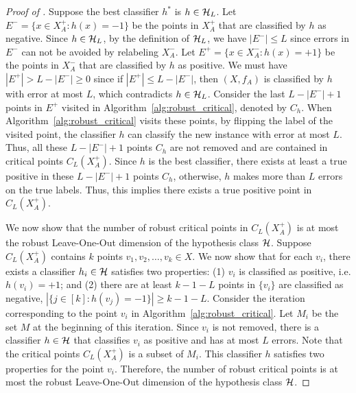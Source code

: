 \begin{proof}[Proof of ]
    Suppose the best classifier $h^*$ is $h \in \mathcal{H}_L$. Let $E^- = \{x \in X_A^+: h(x) = -1 \}$ be the points in $X_A^+$ that are classified by $h$ as negative. Since $h \in \mathcal{H}_L$, by the definition of $\mathcal{H}_L$, we have $|E^-| \leq L$ since errors in $E^-$ can not be avoided by relabeling $X_A^-$.
    Let $E^+ = \{x \in X_A^-: h(x) = +1\}$ be the points in $X_A^-$ that are classified by $h$ as positive. We must have $|E^+| > L-|E^-| \geq 0$ since if $|E^+| \leq L-|E^-|$, then $(X,f_A)$ is classified by $h$ with error at most $L$, which contradicts $h \in \mathcal{H}_L$. 
    Consider the last $L-|E^-|+1$ points in $E^+$ visited in Algorithm~\ref{alg:robust_critical}, denoted by $C_h$.
    When Algorithm~\ref{alg:robust_critical} visits these points, by flipping the label of the visited point, the classifier $h$ can classify the new instance with error at most $L$. Thus, all these $L-|E^-|+1$ points $C_h$ are not removed and are contained in critical points $C_{L}(X_A^+)$. 
    Since $h$ is the best classifier, there exists at least a true positive in these $L-|E^-|+1$ points $C_h$, otherwise, $h$ makes more than $L$ errors on the true labels. Thus, this implies there exists a true positive point in $C_{L}(X_A^+)$.

    We now show that the number of robust critical points in $C_{L}(X_A^+)$ is at most the robust Leave-One-Out dimension of the hypothesis class $\mathcal{H}$. 
    Suppose $C_{L}(X_A^+)$ contains $k$ points $v_1,v_2, \dots, v_k \in X$. 
    We now show that for each $v_i$, there exists a classifier $h_i \in \mathcal{H}$ satisfies two properties: (1) $v_i$ is classified as positive, i.e. $h(v_i) = +1$; and (2) there are at least $k-1-L$ points in $\{v_i\}$ are classified as negative, $\left|\{j\in[k]\colon  h(v_j) = -1\}\right|\geq k-1-L$.
    Consider the iteration corresponding to the point $v_i$ in Algorithm~\ref{alg:robust_critical}. Let $M_i$ be the set $M$ at the beginning of this iteration. Since $v_i$ is not removed, there is a classifier $h \in \mathcal{H}$ that classifies $v_i$ as positive and has at most $L$ errors. Note that the critical points $C_L(X_A^+)$ is a subset of $M_i$. This classifier $h$ satisfies two properties for the point $v_i$.
    Therefore, the number of robust critical points is at most the robust Leave-One-Out dimension of the hypothesis class $\mathcal{H}$.


\end{proof}
